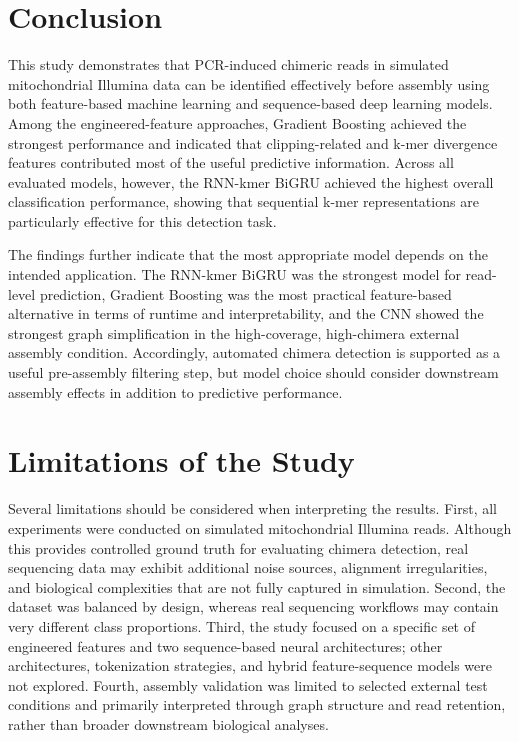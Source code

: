 \section{Conclusion}

This study demonstrates that PCR-induced chimeric reads in simulated mitochondrial Illumina data can be identified effectively before assembly using both feature-based machine learning and sequence-based deep learning models. Among the engineered-feature approaches, Gradient Boosting achieved the strongest performance and indicated that clipping-related and k-mer divergence features contributed most of the useful predictive information. Across all evaluated models, however, the RNN-kmer BiGRU achieved the highest overall classification performance, showing that sequential k-mer representations are particularly effective for this detection task.

The findings further indicate that the most appropriate model depends on the intended application. The RNN-kmer BiGRU was the strongest model for read-level prediction, Gradient Boosting was the most practical feature-based alternative in terms of runtime and interpretability, and the CNN showed the strongest graph simplification in the high-coverage, high-chimera external assembly condition. Accordingly, automated chimera detection is supported as a useful pre-assembly filtering step, but model choice should consider downstream assembly effects in addition to predictive performance.

\section{Limitations of the Study}

Several limitations should be considered when interpreting the results. First, all experiments were conducted on simulated mitochondrial Illumina reads. Although this provides controlled ground truth for evaluating chimera detection, real sequencing data may exhibit additional noise sources, alignment irregularities, and biological complexities that are not fully captured in simulation. Second, the dataset was balanced by design, whereas real sequencing workflows may contain very different class proportions. Third, the study focused on a specific set of engineered features and two sequence-based neural architectures; other architectures, tokenization strategies, and hybrid feature-sequence models were not explored. Fourth, assembly validation was limited to selected external test conditions and primarily interpreted through graph structure and read retention, rather than broader downstream biological analyses.

